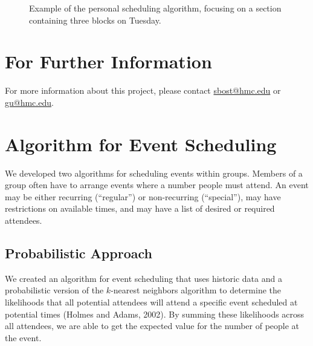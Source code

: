 \documentclass[thesis]{hmcposter}
\begin{document}
\begin{poster}
\begin{figure}
{        }\qquad\qquad
  \caption[]{Example of the personal scheduling algorithm, focusing on a section containing three blocks on Tuesday.}%
  \label{fig:small-multiples}
\end{figure}



\section{For Further Information}
For more information about this project, please contact \url{sbost@hmc.edu} or \url{gu@hmc.edu}.


\section{Algorithm for Event Scheduling}
We developed two algorithms for scheduling events within groups.
Members of a group often have to arrange events where a number people must attend.
An event may be either recurring (``regular'') or non-recurring (``special''), may have restrictions on available times, and may have a list of desired or required attendees.

\subsection{Probabilistic Approach}
We created an algorithm for event scheduling that uses historic data and a probabilistic version of the $k$-nearest neighbors algorithm to determine the likelihoods that all potential attendees will attend a specific event scheduled at potential times (Holmes and Adams, 2002).
By summing these likelihoods across all attendees, we are able to get the expected value for the number of people at the event.


\end{poster}
\end{document}

